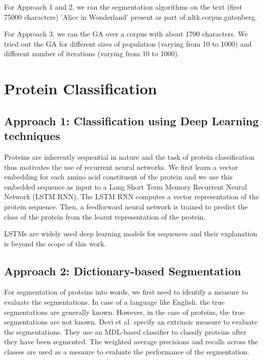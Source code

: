 \documentclass[runningheads]{llncs}
\begin{document}
For Approach 1 and 2, we ran the segmentation algorithms on the text (first 75000 characters) 'Alice in Wonderland' present as part of  nltk.corpus.gutenberg. 

For Approach 3, we ran the GA over a corpus with about 1700 characters. We tried out the GA for different sizes of population (varying from 10 to 1000) and different number of iterations (varying from 10 to 1000).

\section{Protein Classification}


\subsection{Approach 1: Classification using Deep Learning techniques}

Proteins are inherently sequential in nature and the task of protein classification thus motivates the use of recurrent neural networks. We first learn a vector embedding for each amino acid constituent of the protein and we use this embedded sequence as input to  a Long Short Term Memory Recurrent Neural Network (LSTM RNN). The LSTM RNN computes a vector representation of the protein sequence. Then, a feedforward neural network is trained to predict the class of the protein from the learnt representation of the protein.

LSTMs are widely used deep learning models for sequences and their explanation is beyond the scope of this work. 


\subsection{Approach 2: Dictionary-based Segmentation}
For segmentation of proteins into words, we first need to identify a measure to evaluate the segmentations. In case of a language like English. the true segmentations are generally known. However, in the case of proteins, the true segmentations are not known. Devi et al. \cite{devi2017protein} specify an extrinsic measure to evaluate the segmentations. They use an MDL-based classifier to classify proteins after they have been segmented. The weighted average precisions and recalls across the classes are used as a mesaure to evaluate the performance of the segmentation.
\end{document}
